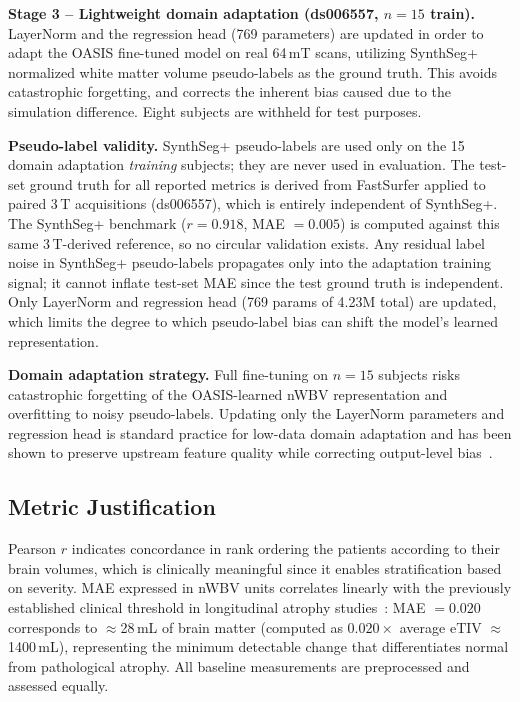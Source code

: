 \documentclass[12pt,a4paper]{article}
\begin{document}
\textbf{Stage 3 -- Lightweight domain adaptation (ds006557, $n= 15$ train).}
LayerNorm and the regression head (769 parameters) are updated in order to
adapt the OASIS fine-tuned model on real 64\,mT scans, utilizing SynthSeg+
normalized white matter volume pseudo-labels as the ground truth. This avoids
catastrophic forgetting, and corrects the inherent bias caused due to the
simulation difference. Eight subjects are withheld for test purposes.

\textbf{Pseudo-label validity.}
SynthSeg+ pseudo-labels are used only on the 15 domain adaptation
\emph{training} subjects; they are never used in evaluation. The test-set
ground truth for all reported metrics is derived from FastSurfer applied to
paired 3\,T acquisitions (ds006557), which is entirely independent of
SynthSeg+. The SynthSeg+ benchmark ($r = 0.918$, MAE $= 0.005$) is computed
against this same 3\,T-derived reference, so no circular validation exists.
Any residual label noise in SynthSeg+ pseudo-labels propagates only into the
adaptation training signal; it cannot inflate test-set MAE since the test
ground truth is independent. Only LayerNorm and regression head (769 params
of 4.23M total) are updated, which limits the degree to which pseudo-label
bias can shift the model's learned representation.

\textbf{Domain adaptation strategy.}
Full fine-tuning on $n=15$ subjects risks catastrophic forgetting of the
OASIS-learned nWBV representation and overfitting to noisy pseudo-labels.
Updating only the LayerNorm parameters and regression head is standard
practice for low-data domain adaptation and has been shown to preserve
upstream feature quality while correcting output-level bias~\cite{karani2018lifelong}.

\subsection{Metric Justification}
\label{sec:metrics}

Pearson $r$ indicates concordance in rank ordering the patients according to
their brain volumes, which is clinically meaningful since it enables
stratification based on severity. MAE expressed in nWBV units correlates
linearly with the previously established clinical threshold in longitudinal
atrophy studies~\cite{buckner2004}: MAE $= 0.020$ corresponds to
$\approx$28\,mL of brain matter (computed as $0.020 \times$ average eTIV
$\approx$1400\,mL), representing the minimum detectable change that
differentiates normal from pathological atrophy. All
baseline measurements are preprocessed and assessed equally.
\end{document}

